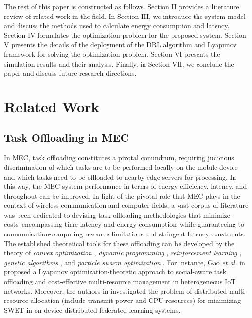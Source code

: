 \documentclass[journal]{IEEEtran}
\begin{document}
The rest of this paper is constructed as follows.
Section II provides a literature review of related work in the field.
In Section III, we introduce the system model and discuss the methods used to calculate energy consumption and latency.
Section IV formulates the optimization problem for the proposed system.
Section V presents the details of the deployment of the DRL algorithm and Lyapunov framework for solving the optimization problem.
Section VI presents the simulation results and their analysis.
Finally, in Section VII, we conclude the paper and discuss future research directions.

\section{Related Work}

\subsection{Task Offloading in MEC}
In MEC, task offloading constitutes a pivotal conundrum, requiring judicious discrimination of which tasks are to be performed locally on the mobile device and which tasks need to be offloaded to nearby edge servers for processing.
In this way, the MEC system performance in terms of energy efficiency, latency, and throughout can be improved.
In light of the pivotal role that MEC plays in the context of wireless communication and computer fields, a vast corpus of literature was been dedicated to devising task offloading methodologies that minimize costs--encompassing time latency and energy consumption--while guaranteeing to communication-computing resource limitations and stringent latency constraints.
The established theoretical tools for these offloading can be developed by the theory of {\em convex optimization} \cite{boyd2004convex}, {\em dynamic programming} \cite{chen2022dynamic},  {\em reinforcement learning} \cite{tang2020deep}, {\em genetic algorithms} \cite{li2020genetic}, and {\em particle swarm optimization} \cite{you2021efficient}.
For instance, Gao \textit{et al.} in \cite{gao2019dynamic} proposed a Lyapunov optimization-theoretic approach to social-aware task offloading and cost-effective multi-resource management in heterogeneous IoT networks.
Moreover, the authors in \cite{gao2022multi} investigated the problem of distributed multi-resource allocation (include transmit power and CPU resources) for minimizing SWET in on-device distributed federated learning systems.
\end{document}
